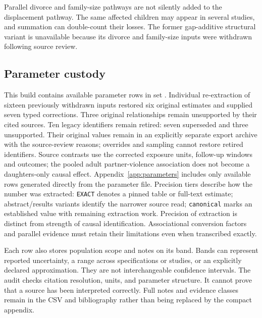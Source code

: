 \documentclass[10pt]{article}
\begin{document}
Parallel divorce and family-size pathways are not silently added to the
displacement pathway. The same affected children may appear in several
studies, and summation can double-count their losses. The former gap-additive structural variant is unavailable because its
divorce and family-size inputs were withdrawn following source review.

\subsection{Parameter custody}
This build contains \ParameterCount{} available parameter rows in set
\ParameterVersion{}. Individual re-extraction of sixteen previously withdrawn
inputs restored six original estimates and supplied seven typed corrections.
Three original relationships remain unsupported by their cited sources. Ten
legacy identifiers remain retired: seven superseded and three unsupported. Their original values remain in an explicitly
separate export archive with the source-review reasons; overrides and
sampling cannot restore retired identifiers. Source contrasts use the corrected
exposure units, follow-up windows and outcomes; the pooled adult partner-violence
association does not become a daughters-only causal effect. Appendix~\ref{app:parameters} includes
only available rows generated directly from the parameter file. Precision tiers describe how the number was
extracted: \texttt{EXACT} denotes a pinned table or full-text estimate;
abstract/results variants identify the narrower source read;
\texttt{canonical} marks an established value with remaining extraction
work. Precision of extraction is distinct from strength of causal
identification. Associational conversion factors and parallel evidence
must retain their limitations even when transcribed exactly.

Each row also stores population scope and notes on its band. Bands can
represent reported uncertainty, a range across specifications or studies,
or an explicitly declared approximation. They are not interchangeable
confidence intervals. The audit checks citation resolution, units, and
parameter structure. It cannot prove that a source has been interpreted
correctly. Full notes and evidence classes remain in the CSV and
bibliography rather than being replaced by the compact appendix.

\end{document}
